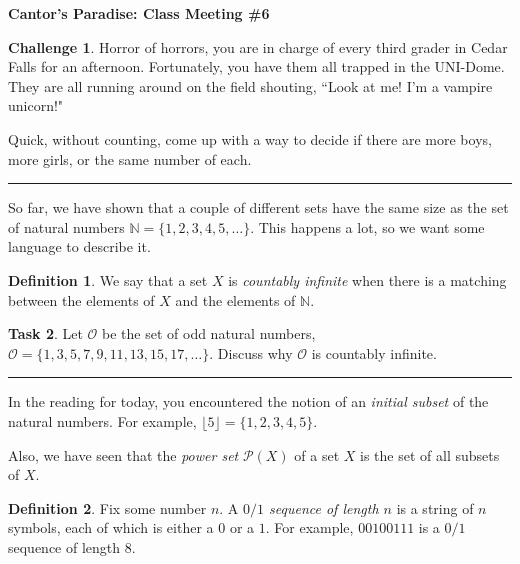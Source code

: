 \documentclass[12pt]{amsart}
\theoremstyle{definition}
\newtheorem{task}{Task}
\newtheorem{challenge}[task]{Challenge}
\newtheorem*{definition}{Definition}
\begin{document}
\begin{center}
\textbf{\Huge
Cantor's Paradise: Class Meeting \#6
}
\end{center}


\vspace{.5in}

\begin{challenge}
Horror of horrors, you are in charge of every third grader in Cedar Falls for an afternoon.
Fortunately, you have them all trapped in the UNI-Dome.
They are all running around on the field shouting, ``Look at me! I'm a vampire unicorn!"

Quick, without counting, come up with a way to decide if there are more boys, more girls, or the same number of each.
\end{challenge}


\vspace{.1in}
\hrule
\vspace{.1in}

So far, we have shown that a couple of different sets have the same size as the set of natural numbers $\mathbb{N} = \{1, 2, 3, 4, 5, \dots\}$.
This happens a lot, so we want some language to describe it.

\begin{definition}
We say that a set $X$ is \emph{countably infinite} when there is a matching between the elements of $X$ and the elements of $\mathbb{N}$.
\end{definition}

\begin{task} Let $\mathcal{O}$ be the set of odd natural numbers,
$\mathcal{O} = \{ 1, 3, 5, 7, 9, 11, 13, 15, 17, \dots\}$.
Discuss why $\mathcal{O}$ is countably infinite.
\end{task}

\vspace{.1in}
\hrule
\vspace{.1in}

In the reading for today, you encountered the notion of an \emph{initial subset} of the natural numbers.
For example, $\lfloor 5 \rfloor = \{1, 2, 3, 4, 5\}$.

Also, we have seen that the \emph{power set} $\mathcal{P}(X)$ of a set $X$ is the set of all subsets of $X$.

\begin{definition}
Fix some number $n$. A \emph{$0/1$ sequence of length $n$} is a string of $n$ symbols, each of which is either a $0$ or a $1$.
For example, $00100111$ is a $0/1$ sequence of length $8$.
\end{definition}
\end{document}
